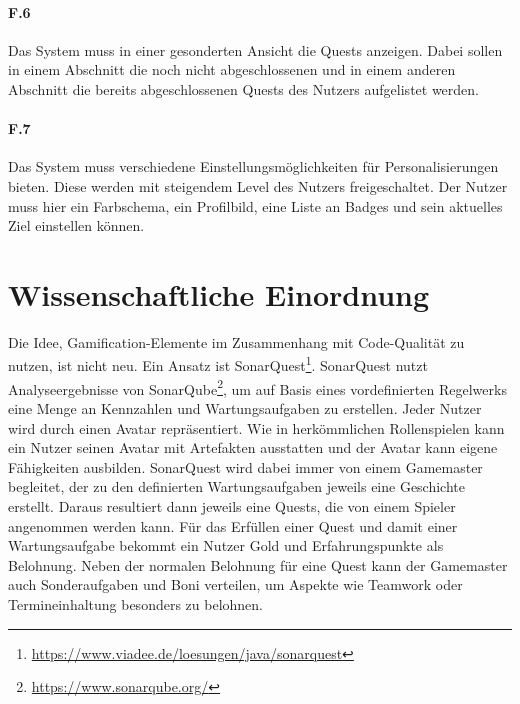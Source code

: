 \documentclass[
	oneside,  %
	ngerman, 
	final, 
	11pt, 
	a4paper, 
	1.1headlines, 
	headinclude=false, 
	footinclude=false, 
	mpinclude=false, 
	pagesize, 
	onecolumn, 
	titlepage, 
	parskip=half, 
	headsepline, 
	chapterprefix=false, 
	version=first, 
	listof=totoc, 
	bibliography=totoc, 
	toc=graduated, 
	fleqn
]{scrbook}
\begin{document}
\paragraph{F.6}
Das System muss in einer gesonderten Ansicht die Quests anzeigen.
Dabei sollen in einem Abschnitt die noch nicht abgeschlossenen und in einem anderen Abschnitt die bereits abgeschlossenen Quests des Nutzers aufgelistet werden.

\paragraph{F.7}
Das System muss verschiedene Einstellungsmöglichkeiten für Personalisierungen bieten.
Diese werden mit steigendem Level des Nutzers freigeschaltet.
Der Nutzer muss hier ein Farbschema, ein Profilbild, eine Liste an Badges und sein aktuelles Ziel einstellen können.

\section{Wissenschaftliche Einordnung}
\label{Wissenschaftliche_Einordnung}
Die Idee, Gamification-Elemente im Zusammenhang mit Code-Qualität zu nutzen, ist nicht neu.
Ein Ansatz ist SonarQuest\footnote{\url{https://www.viadee.de/loesungen/java/sonarquest}}.
SonarQuest nutzt Analyseergebnisse von SonarQube\footnote{\url{https://www.sonarqube.org/}}, um auf Basis eines vordefinierten Regelwerks eine Menge an Kennzahlen und Wartungsaufgaben zu erstellen.
Jeder Nutzer wird durch einen Avatar repräsentiert.
Wie in herkömmlichen Rollenspielen kann ein Nutzer seinen Avatar mit Artefakten ausstatten und der Avatar kann eigene Fähigkeiten ausbilden.
SonarQuest wird dabei immer von einem Gamemaster begleitet, der zu den definierten Wartungsaufgaben jeweils eine Geschichte erstellt.
Daraus resultiert dann jeweils eine Quests, die von einem Spieler angenommen werden kann.
Für das Erfüllen einer Quest und damit einer Wartungsaufgabe bekommt ein Nutzer Gold und Erfahrungspunkte als Belohnung. 
Neben der normalen Belohnung für eine Quest kann der Gamemaster auch Sonderaufgaben und Boni verteilen, um Aspekte wie Teamwork oder Termineinhaltung besonders zu belohnen.\cite{SonarQuest}
\end{document}
